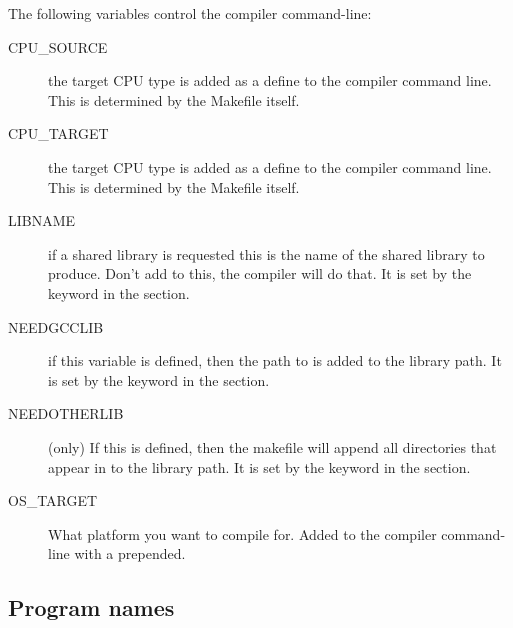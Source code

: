 The following variables control the compiler command-line:
\begin{description}

\item[CPU\_SOURCE] the target CPU type is added as a define to the compiler
command line. This is determined by the Makefile itself.

\item[CPU\_TARGET] the target CPU type is added as a define to the compiler
command line. This is determined by the Makefile itself.

\item[LIBNAME] if a shared library is requested this is the name of the
shared library to produce. Don't add  to this, the compiler will
do that.
It is set by the  keyword in the  section.

\item[NEEDGCCLIB] if this variable is defined, then the path to 
is added to the library path.
It is set by the  keyword in the  section.

\item[NEEDOTHERLIB] (\linux only) If this is defined, then the makefile will
append all directories that appear in  to the library path.
It is set by the  keyword in the  section.

\item[OS\_TARGET] What platform you want to compile for. Added to the
compiler command-line with a  prepended.


\end{description}


\subsection{Program names}

